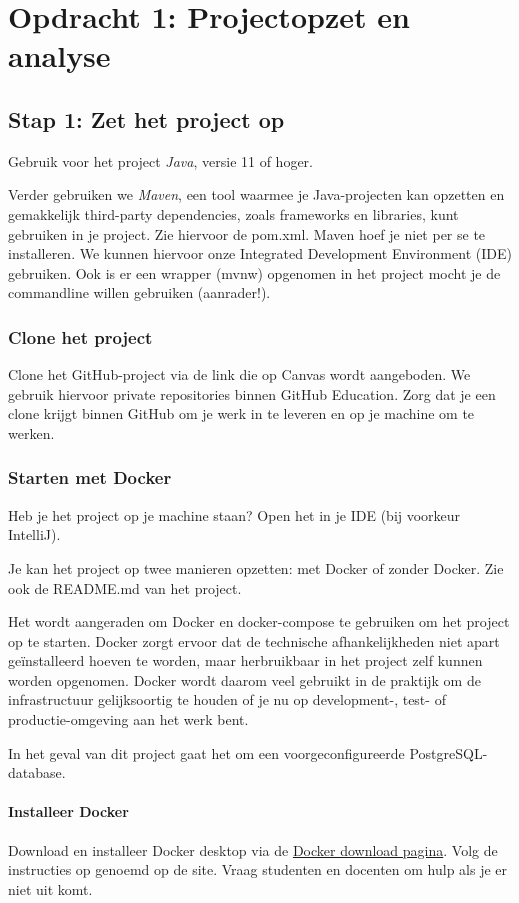 \chapter{Opdracht 1: Projectopzet en analyse}

\section{Stap 1: Zet het project op}
Gebruik voor het project \textit{Java}, versie 11 of hoger.

Verder gebruiken we \textit{Maven}, een tool waarmee je Java-projecten kan opzetten
en gemakkelijk third-party dependencies, zoals frameworks en libraries, kunt 
gebruiken in je project. Zie hiervoor de pom.xml. Maven hoef je niet per se te 
installeren. We kunnen hiervoor onze Integrated Development Environment (IDE) gebruiken.
Ook is er een wrapper (mvnw) opgenomen in het project mocht je de commandline willen gebruiken (aanrader!). 

\subsection{Clone het project}
Clone het GitHub-project via de link die op Canvas wordt aangeboden.
We gebruik hiervoor private repositories binnen GitHub Education.
Zorg dat je een clone krijgt binnen GitHub om je werk in te leveren 
en op je machine om te werken.

\subsection{Starten met Docker}
Heb je het project op je machine staan? Open het in je IDE (bij voorkeur IntelliJ).

Je kan het project op twee manieren opzetten: met Docker of zonder Docker. 
Zie ook de README.md van het project. 

Het wordt aangeraden om Docker en docker-compose te gebruiken om het project op te starten.
Docker zorgt ervoor dat de technische afhankelijkheden niet apart geïnstalleerd hoeven te worden,
maar herbruikbaar in het project zelf kunnen worden opgenomen.
Docker wordt daarom veel gebruikt in de praktijk om de infrastructuur gelijksoortig te houden 
of je nu op development-, test- of productie-omgeving aan het werk bent.

In het geval van dit project gaat het om een voorgeconfigureerde PostgreSQL-database.

\subsubsection{Installeer Docker}
Download en installeer Docker desktop via de 
\href{https://www.docker.com/products/docker-desktop}{Docker download pagina}.
Volg de instructies op genoemd op de site.
Vraag studenten en docenten om hulp als je er niet uit komt.

